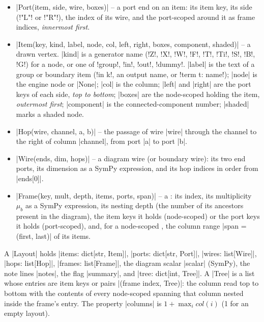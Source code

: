\begin{definition}\label{def:pictorial-records}
\begin{itemize}
  \item \py|Port(item, side, wire, boxes)| -- a port end on an item: its item key, its side
    (\code!"L"! or \code!"R"!), the index of its wire, and the port-scoped \bboxes{} around it as
    frame indices, \emph{innermost first}.
  \item \py|Item(key, kind, label, node, col, left, right, boxes, component, shaded)| -- a drawn
    vertex. \py|kind| is a generator name (\code!Z!, \code!X!, \code!W!, \code!F!, \code!T!,
    \code!Ti!, \code!S!, \code!B!, \code!G!) for a node, or one of \code!group!, \code!in!,
    \code!out!, \code!dummy!. \py|label| is the text of a group or boundary item (\code!in k!,
    an output name, or \code!term t: name!); \py|node| is the engine node or \py|None|;
    \py|col| is the column; \py|left| and \py|right| are the port keys of each side,
    \emph{top to bottom}; \py|boxes| are the node-scoped \bboxes{} holding the item,
    \emph{outermost first}; \py|component| is the connected-component number; \py|shaded|
    marks a shaded node.
  \item \py|Hop(wire, channel, a, b)| -- the passage of wire \py|wire| through the channel to
    the right of column \py|channel|, from port \py|a| to port \py|b|.
  \item \py|Wire(ends, dim, hops)| -- a diagram wire (or boundary wire): its two end ports,
    its dimension as a SymPy expression, and its hop indices in order from \py|ends[0]|.
  \item \py|Frame(key, mult, depth, items, ports, span)| -- a \bbox: its index, its
    multiplicity $\mu_b$ as a SymPy expression, its nesting depth (the number of its ancestors
    present in the diagram), the item keys it holds (node-scoped) or the port keys it holds
    (port-scoped), and, for a node-scoped \bbox, the column range \py|span = (first, last)|
    of its items.
\end{itemize}
\end{definition}

\begin{definition}[Layout]\label{def:pictorial-layout}
A \py|Layout| holds \py|items: dict[str, Item]|, \py|ports: dict[str, Port]|,
\py|wires: list[Wire]|, \py|hops: list[Hop]|, \py|frames: list[Frame]|, the diagram scalar
\py|scalar| (SymPy), the note lines \py|notes|, the flag \py|summary|, and
\py|tree: dict[int, Tree]|. A \py|Tree| is a list whose entries are item keys or pairs
\py|(frame index, Tree)|: the column read top to bottom with the contents of every node-scoped
\bbox{} spanning that column nested inside the frame's entry. The property \py|columns| is
$1 + \max_i \mathit{col}(i)$ (1 for an empty layout).
\end{definition}

